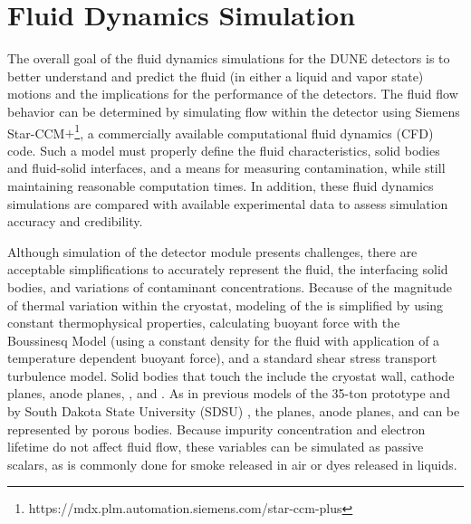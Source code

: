 

\section{Fluid Dynamics Simulation}
The overall goal of the fluid dynamics simulations for the DUNE detectors is to better understand and predict the fluid (in either a liquid and vapor state) motions and the implications for the performance of the detectors. The fluid flow behavior can be determined by simulating  flow within the detector using Siemens Star-CCM$+$\footnote{https://mdx.plm.automation.siemens.com/star-ccm-plus}, a commercially available computational fluid dynamics (CFD) code.  Such a model must properly define the fluid characteristics, solid bodies and fluid-solid interfaces, and a means for measuring contamination, while still maintaining reasonable computation times. In addition, these fluid dynamics simulations are compared with available experimental data to assess simulation accuracy and credibility. 

Although simulation of the detector module presents challenges, there are acceptable simplifications to accurately represent the fluid, the interfacing solid bodies, and variations of contaminant concentrations. Because of the magnitude of thermal variation within the cryostat, modeling of the  is simplified by using constant thermophysical properties, calculating buoyant force with the Boussinesq Model (using a constant density for the fluid with application of a temperature dependent buoyant force), and a standard shear stress transport turbulence model. Solid bodies that touch the  include the cryostat wall, cathode planes, anode planes, , and . As in previous  models of the  35-ton prototype and  by South Dakota State University (SDSU)  \cite{docdb-5915}, the  planes, anode planes, and  can be represented by porous bodies. Because impurity concentration and electron lifetime do not affect fluid flow, these variables can be simulated as passive scalars, as is commonly done for smoke released \cite{cfd-1} 
in air or dyes released in liquids.

